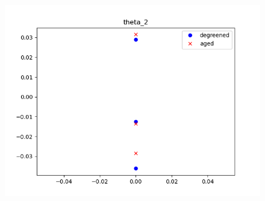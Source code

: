\begin{figure}[H]
\begin{minipage}{0.33\textwidth}
                \includegraphics[width = \textwidth]{./figs/figs_new_mdl/theta_2.png}
        \end{minipage}
\end{figure}

